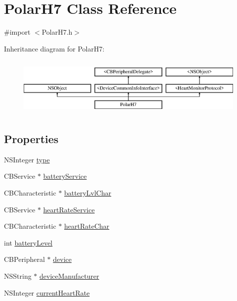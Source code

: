 \hypertarget{interface_polar_h7}{\section{Polar\-H7 Class Reference}
\label{interface_polar_h7}
}


{\ttfamily \#import $<$Polar\-H7.\-h$>$}

Inheritance diagram for Polar\-H7\-:\begin{figure}[H]
\begin{center}
\leavevmode
\includegraphics[height=2.901554cm]{interface_polar_h7}
\end{center}
\end{figure}
\subsection*{Properties}
\begin{DoxyCompactItemize}
\item 
N\-S\-Integer \hyperlink{interface_polar_h7_a3819e12cc9802bca0611683cdeaf5775}{type}
\item 
C\-B\-Service $\ast$ \hyperlink{interface_polar_h7_a53721638b179d9373c6a3e17f6ffb3c9}{battery\-Service}
\item 
C\-B\-Characteristic $\ast$ \hyperlink{interface_polar_h7_a477f7039b2dd7cdcd96519b19cb72581}{battery\-Lvl\-Char}
\item 
C\-B\-Service $\ast$ \hyperlink{interface_polar_h7_a18e69a928d7c29c7db4c6ca05b840064}{heart\-Rate\-Service}
\item 
C\-B\-Characteristic $\ast$ \hyperlink{interface_polar_h7_a64ceb31db248ce9151f0ee1d97d97e6c}{heart\-Rate\-Char}
\item 
int \hyperlink{interface_polar_h7_a333bcccf6282727ccd5e159a66fb6376}{battery\-Level}
\item 
C\-B\-Peripheral $\ast$ \hyperlink{interface_polar_h7_a8ac64bcce44c2cff369e6edf4e58329d}{device}
\item 
N\-S\-String $\ast$ \hyperlink{interface_polar_h7_ad654b125b8f042a6c2407ad4840ac401}{device\-Manufacturer}
\item 
N\-S\-Integer \hyperlink{interface_polar_h7_a1d4ad05750f8373bdf15aad8f9e2cb6d}{current\-Heart\-Rate}
\end{DoxyCompactItemize}
